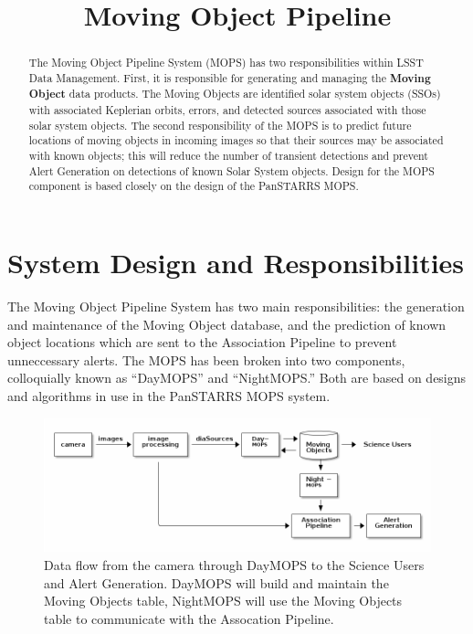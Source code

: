 \documentclass[12pt,preprint]{aastex}
\begin{document}
\title{Moving Object Pipeline}

\author{}

\begin{abstract}

The Moving Object Pipeline System (MOPS) has two responsibilities
within LSST Data Management.  First, it is responsible for generating
and managing the \textbf{Moving Object} data products.  The Moving
Objects are identified solar system objects (SSOs) with associated
Keplerian orbits, errors, and detected sources associated with those
solar system objects.  The second responsibility of the MOPS is to
predict future locations of moving objects in incoming images so that
their sources may be associated with known objects; this will reduce
the number of transient detections and prevent Alert Generation on
detections of known Solar System objects.  Design for the MOPS
component is based closely on the design of the PanSTARRS MOPS.

\end{abstract}

\tableofcontents


\section{System Design and Responsibilities}

The Moving Object Pipeline System has two main responsibilities: the
generation and maintenance of the Moving Object database, and the
prediction of known object locations which are sent to the Association
Pipeline to prevent unneccessary alerts.  The MOPS has been broken
into two components, colloquially known as ``DayMOPS'' and ``NightMOPS.''
Both are based on designs and algorithms in use in the PanSTARRS MOPS
system.
 

\begin{figure}[!ht]
\centering
  \includegraphics[width=13cm]{illustrations/mopsWithinLsst.png}
\caption{ Data flow from the camera through DayMOPS to the Science
  Users and Alert Generation.  DayMOPS will build and maintain the
  Moving Objects table, NightMOPS will use the Moving Objects table to
  communicate with the Assocation Pipeline.  }
\label{mopsWithinLsst}
\end{figure}
\end{document}
